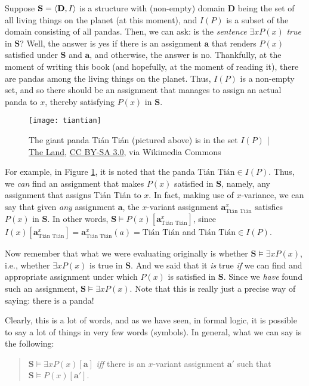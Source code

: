 Suppose $\mathbf{S}=\langle\mathbf{D}, I\rangle$ is a structure with (non-empty) domain $\mathbf{D}$ being the set of all living things on the planet (at this moment), and $I(P)$ is a subset of the domain consisting of all pandas. Then, we can ask: is the \textit{sentence} $\exists x P(x)$ \textit{true} in $\mathbf{S}$? Well, the answer is yes if there is an assignment $\mathbf{a}$ that renders $P(x)$ satisfied under $\mathbf{S}$ and $\mathbf{a}$, and otherwise, the answer is no. Thankfully, at the moment of writing this book (and hopefully, at the moment of reading it), there are pandas among the living things on the planet. Thus, $I(P)$ is a non-empty set, and so there should be an assignment that manages to assign an actual panda to $x$, thereby satisfying $P(x)$ in $\mathbf{S}$. 

\begin{figure}[h] \label{tiantian}
\begin{center}
\texttt{[image: tiantian]}
\caption{The giant panda Tián Tián (pictured above) is in the set $I(P)$ |
\href{https://commons.wikimedia.org/wiki/User:The_Land}{The Land}, \href{https://creativecommons.org/licenses/by-sa/3.0/deed.en}{CC BY-SA 3.0}, via Wikimedia Commons}
\end{center}
\end{figure}

For example, in Figure \ref{tiantian}, it is noted that the panda $\text{Tián Tián} \in I(P)$. Thus, we \textit{can} find an assignment that makes $P(x)$ satisfied in $\mathbf{S}$, namely, any assignment that assigns Tián Tián to $x$. In fact, making use of $x$-variance, we can say that given \textit{any} assignment $\mathbf{a}$, the $x$-variant assignment $\mathbf{a}^x_\text{Tián Tián}$ satisfies $P(x)$ in $\mathbf{S}$. In other words, $\mathbf{S} \models P(x)[\mathbf{a}^x_\text{Tián Tián}]$, since $I(x)[\mathbf{a}^x_\text{Tián Tián}]=\mathbf{a}^x_\text{Tián Tián}(a)=\text{Tián Tián}$ and $\text{Tián Tián} \in I(P)$. 

Now remember that what we were evaluating originally is whether $\mathbf{S} \models \exists x P(x)$, i.e., whether $\exists x P(x)$ is true in $\mathbf{S}$. And we said that it \textit{is} true \textit{if} we can find and appropriate assignment under which $P(x)$ is satisfied in $\mathbf{S}$. Since we \textit{have} found such an assignment, $\mathbf{S} \models \exists x P(x)$. Note that this is really just a precise way of saying: there is a panda!

Clearly, this is a lot of words, and as we have seen, in formal logic, it is possible to say a lot of things in very few words (symbols). In general, what we can say is the following:
\begin{quote}
$\mathbf{S} \models \exists x P(x)[\mathbf{a}]$ \textit{iff} there is an $x$-variant assignment $\mathbf{a}'$ such that $\mathbf{S} \models P(x)[\mathbf{a}']$. 
\end{quote}

